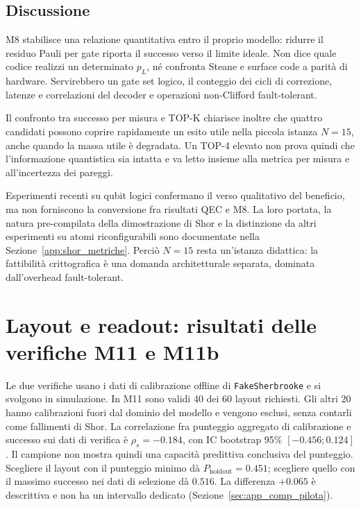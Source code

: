 \begin{onehalfspace}
\subsection{Discussione}
\label{subsec:discussione_logico}

M8 stabilisce una relazione quantitativa entro il proprio modello: ridurre il
residuo Pauli per gate riporta il successo verso il limite ideale. Non dice
quale codice realizzi un determinato $p_L$, n\'e confronta Steane e surface
code a parit\`a di hardware. Servirebbero un gate set logico, il conteggio dei
cicli di correzione, latenze e correlazioni del decoder e operazioni
non-Clifford fault-tolerant.

Il confronto tra successo per misura e TOP-K chiarisce inoltre che quattro
candidati possono coprire rapidamente un esito utile nella piccola istanza
$N=15$, anche quando la massa utile \`e degradata. Un TOP-4 elevato non prova
quindi che l'informazione quantistica sia intatta e va letto insieme alla
metrica per misura e all'incertezza dei pareggi.

Esperimenti recenti su qubit logici confermano il verso qualitativo del
beneficio, ma non forniscono la conversione fra risultati QEC e M8. La loro
portata, la natura pre-compilata della dimostrazione di Shor e la distinzione da
altri esperimenti su atomi riconfigurabili sono documentate nella
Sezione~\ref{app:shor_metriche}. Perci\`o $N=15$ resta un'istanza didattica: la
fattibilit\`a crittografica \`e una domanda architetturale separata, dominata
dall'overhead fault-tolerant.

\section{Layout e readout: risultati delle verifiche M11 e M11b}
\label{sec:layout_risultati}

Le due verifiche usano i dati di calibrazione offline di \texttt{FakeSherbrooke} e si svolgono in simulazione. In M11 sono validi 40 dei 60 layout richiesti. Gli altri 20 hanno calibrazioni fuori dal dominio del modello e vengono esclusi, senza contarli come fallimenti di Shor. La correlazione fra punteggio aggregato di calibrazione e successo sui dati di verifica è $\rho_s=-0.184$, con IC bootstrap 95\% $[-0.456;0.124]$. Il campione non mostra quindi una capacità predittiva conclusiva del punteggio. Scegliere il layout con il punteggio minimo dà $P_{\mathrm{holdout}}=0.451$; scegliere quello con il massimo successo nei dati di selezione dà $0.516$. La differenza $+0.065$ è descrittiva e non ha un intervallo dedicato (Sezione~\ref{sec:app_comp_pilota}).


\end{onehalfspace}
